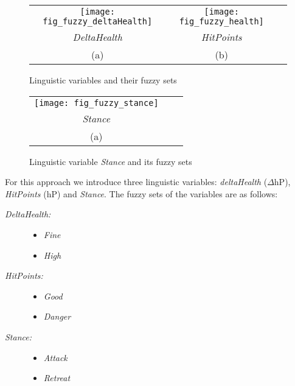 %
\begin{figure*}[htbp]
\begin{center}
\begin{tabular}{ccc}
{\texttt{[image: fig\_fuzzy\_deltaHealth]}}&
{\texttt{[image: fig\_fuzzy\_health]}}\\
{\it DeltaHealth } & {\it HitPoints }  \\
(a) & (b) \\
\end{tabular}
\end{center}
\caption{Linguistic variables and their fuzzy sets}
\label{fig:fuzzy_sets}
\end{figure*}
%
\begin{figure}
\begin{center}
\begin{tabular}{ccc}
{\texttt{[image: fig\_fuzzy\_stance]}} \\ 
{\it Stance} \\
 (a) \\
\end{tabular}
\end{center}
\caption{Linguistic variable {\it Stance} and its fuzzy sets}
\label{fig:fuzzy_sets1}
\end{figure}
%
For this approach we introduce three linguistic variables: {\it deltaHealth } ($\Delta \textrm{hP}$), {\it HitPoints } ($\textrm{hP}$) and {\it Stance}.
The fuzzy sets of the variables are as follows:
\begin{description}
	\item[{\it DeltaHealth:}] \hfill
	\begin{itemize}
		\item {\it Fine}
		\item {\it High}
	\end{itemize}
	\item[{\it HitPoints:}]  \hfill
	\begin{itemize}
		\item {\it Good}
		\item {\it Danger}
	\end{itemize}
	\item[{\it Stance:}]  \hfill
		\begin{itemize}
		\item {\it Attack}
		\item {\it Retreat}
	\end{itemize}
\end{description}

